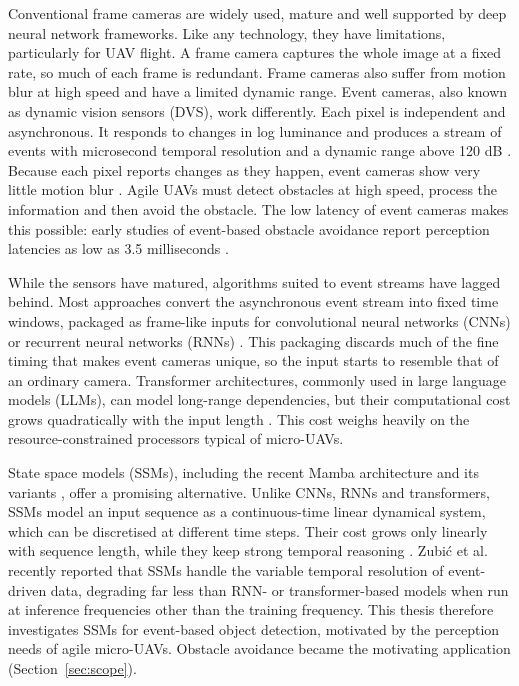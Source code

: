 \documentclass[11pt, a4paper]{report}
\begin{document}
Conventional frame cameras are widely used, mature and well supported by deep neural network frameworks. Like any technology, they have limitations, particularly for UAV flight. A frame camera captures the whole image at a fixed rate, so much of each frame is redundant. Frame cameras also suffer from motion blur at high speed and have a limited dynamic range. Event cameras, also known as dynamic vision sensors (DVS), work differently. Each pixel is independent and asynchronous. It responds to changes in log luminance and produces a stream of events with microsecond temporal resolution and a dynamic range above 120 dB \cite{gallego2020event}. Because each pixel reports changes as they happen, event cameras show very little motion blur \cite{gallego2020event}. Agile UAVs must detect obstacles at high speed, process the information and then avoid the obstacle. The low latency of event cameras makes this possible: early studies of event-based obstacle avoidance \cite{falanga2020dynamic, sanket2020evdodgenet} report perception latencies as low as 3.5 milliseconds \cite{falanga2020dynamic}.

While the sensors have matured, algorithms suited to event streams have lagged behind. Most approaches convert the asynchronous event stream into fixed time windows, packaged as frame-like inputs for convolutional neural networks (CNNs) or recurrent neural networks (RNNs) \cite{gehrig2019end, gehrig2023recurrent}. This packaging discards much of the fine timing that makes event cameras unique, so the input starts to resemble that of an ordinary camera. Transformer architectures, commonly used in large language models (LLMs), can model long-range dependencies, but their computational cost grows quadratically with the input length \cite{vaswani2017attention}. This cost weighs heavily on the resource-constrained processors typical of micro-UAVs.

State space models (SSMs), including the recent Mamba architecture and its variants \cite{gu2023mamba, dao2024transformers}, offer a promising alternative. Unlike CNNs, RNNs and transformers, SSMs model an input sequence as a continuous-time linear dynamical system, which can be discretised at different time steps. Their cost grows only linearly with sequence length, while they keep strong temporal reasoning \cite{gu2023mamba, gu2022efficiently}. Zubi\'{c} et al.~\cite{zubic2024state} recently reported that SSMs handle the variable temporal resolution of event-driven data, degrading far less than RNN- or transformer-based models when run at inference frequencies other than the training frequency. This thesis therefore investigates SSMs for event-based object detection, motivated by the perception needs of agile micro-UAVs. Obstacle avoidance became the motivating application (Section~\ref{sec:scope}).
\newpage
\end{document}

